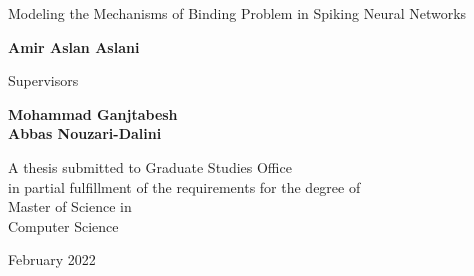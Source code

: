 \documentclass[12pt]{report}
\begin{document}
\begin{latin}
		\begin{center}
			\huge{Modeling the Mechanisms of Binding Problem in Spiking Neural Networks}
		\end{center}
		
		\begin{center}
		\end{center}
		
		\begin{center}
			\textbf{
				Amir Aslan Aslani
				\\[30pt]
			}
		\end{center}
		
		
		\begin{center}
			Supervisors
		\end{center}
		\begin{center}
			\textbf{
				Mohammad Ganjtabesh
				\\[5pt]
				Abbas Nouzari-Dalini
			}
		\end{center}
		
		
		\vspace{3cm}
		\begin{center}
			A thesis submitted to Graduate Studies Office\\
			in partial fulfillment of the requirements for the degree of \\
			Master of Science in\\
			Computer Science
		\end{center}
		
		\begin{center}
			February 2022
		\end{center}
		
		
	\end{latin}
	
\end{document}
